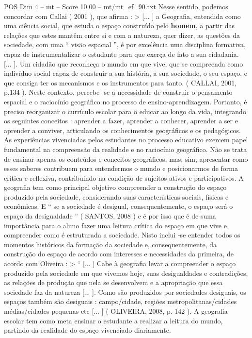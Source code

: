 \begin{textsample}{POS Dim 4 – mt – Score 10.00 – mt/mt\_ef\_90.txt}
Nesse sentido, podemos concordar com Callai ( 2001 ), que afirma : > [... ] a Geografia, entendida como uma ciência social, que estuda o espaço construído pelo \textbf{homem}, a partir das relações que estes mantêm entre si e com a natureza, quer dizer, as questões da sociedade, com uma “ visão espacial ”, é por excelência uma disciplina formativa, capaz de instrumentalizar o estudante para que exerça de fato a sua cidadania. [... ].
Um cidadão que reconheça o mundo em que vive, que se compreenda como indivíduo social capaz de construir a sua história, a sua sociedade, o seu espaço, e que consiga ter os mecanismos e os instrumentos para tanto. ( CALLAI, 2001, p.134 ).
Neste contexto, percebe -se a necessidade de construir o pensamento espacial e o raciocínio geográfico no processo de ensino-aprendizagem.
Portanto, é preciso reorganizar o currículo escolar para o educar ao longo da vida, integrando os seguintes conceitos : aprender a fazer, aprender a conhecer, aprender a ser e aprender a conviver, articulando os conhecimentos geográficos e os pedagógicos.
As experiências vivenciadas pelos estudantes no processo educativo exercem papel fundamental na compreensão da realidade e no raciocínio geográfico.
Não se trata de ensinar apenas os conteúdos e conceitos geográficos, mas, sim, apresentar como esses saberes contribuem para entendermos o mundo e posicionarmos de forma crítica e reflexiva, contribuindo na condição de sujeitos ativos e participativos.
A geografia tem como principal objetivo compreender a construção do espaço produzido pela sociedade, considerando suas características sociais, físicas e econômicas.
E “ se a sociedade é desigual, consequentemente, o espaço será o espaço da desigualdade ” ( SANTOS, 2008 ) e é por isso que é de suma importância para o aluno fazer uma leitura crítica do espaço em que vive e compreender como é estruturada a sociedade.
Nisto inclui -se entender todos os momentos históricos da formação da sociedade e, consequentemente, da construção do espaço de acordo com interesses e necessidades da primeira, de acordo com Oliveira : > “ [... ] Cabe à geografia levar a compreender o espaço produzido pela sociedade em que vivemos hoje, suas desigualdades e contradições, as relações de produção que nela se desenvolvem e a apropriação que essa sociedade faz da natureza [... ].
Como são produzidos por sociedades desiguais, os espaços também são desiguais : campo/cidade, regiões metropolitanas/cidades médias/cidades pequenas etc [... ] ( OLIVEIRA, 2008, p. 142 ).
A geografia escolar tem como meta ensinar o estudante a realizar a leitura do mundo, partindo da realidade do espaço vivenciado diariamente.

\end{textsample}
